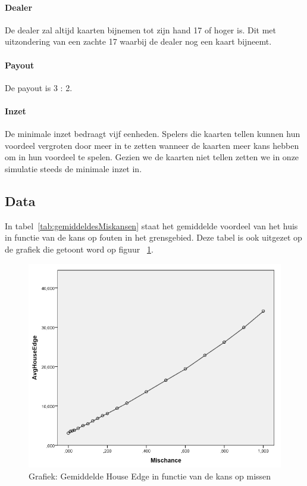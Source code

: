 \documentclass[conference]{IEEEtran}
\begin{document}
\paragraph{Dealer}
De dealer zal altijd kaarten bijnemen tot zijn hand 17 of hoger is. Dit met uitzondering van een zachte 17 waarbij de dealer nog een kaart bijneemt.
\paragraph{Payout}
De payout is 3 : 2.
\paragraph{Inzet}
De minimale inzet bedraagt vijf eenheden. Spelers die kaarten tellen kunnen hun voordeel vergroten door meer in te zetten wanneer de kaarten meer kans hebben om in hun voordeel te spelen. Gezien we de kaarten niet tellen zetten we in onze simulatie steeds de minimale inzet in.


\subsection{Data}
In tabel~\ref{tab:gemiddeldesMiskansen} staat het gemiddelde voordeel van het huis in functie van de kans op fouten in het grensgebied. Deze tabel is ook uitgezet op de grafiek die getoont word op figuur ~\ref{fig:HouseEdgeMissen}.

\begin{figure}[H]
	\includegraphics[width=\linewidth]{img/grafiek.jpg}
  	\caption{Grafiek: Gemiddelde House Edge in functie van de kans op missen}
  	\label{fig:HouseEdgeMissen}
\end{figure}
\end{document}
